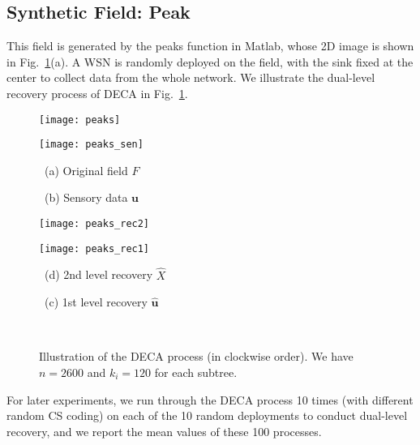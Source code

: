\documentclass[conference]{IEEEtran}
\begin{document}
  \subsection{Synthetic Field: Peak} \label{sec:peak}
This field is generated by the \textsf{peaks} function in Matlab, whose 2D image is shown in Fig.~\ref{fig:peaksdata}(a). A WSN is randomly deployed on the field, with the sink fixed at the center to collect data from the whole network. We illustrate the dual-level recovery process of DECA in Fig.~\ref{fig:peaksdata}.
    \begin{figure}[ht]
      \begin{center}
\parbox{.48\columnwidth}{\center \texttt{[image: peaks]}}
        \parbox{.48\columnwidth}{\center \texttt{[image: peaks\_sen]}}
        \parbox{.48\columnwidth}{\center\scriptsize~(a) Original field $F$}
        \parbox{.48\columnwidth}{\center\scriptsize~(b) Sensory data $\mathbf{u}$}
        \parbox{.48\columnwidth}{\center \texttt{[image: peaks\_rec2]}} \parbox{.48\columnwidth}{\center \texttt{[image: peaks\_rec1]}} \parbox{.48\columnwidth}{\center\scriptsize~(d) 2nd level recovery $\hat{X}$}\parbox{.48\columnwidth}{\center\scriptsize~(c) 1st level recovery $\mathbf{\hat{u}}$}\\\caption{Illustration of the DECA process (in clockwise order). We have $n = 2600$ and $k_i = 120$ for each subtree.}
        \label{fig:peaksdata}
      \end{center}
\end{figure}
For later experiments, we run through the DECA process 10 times (with different random CS coding) on each of the 10 random deployments to conduct dual-level recovery, and we report the mean values of these 100 processes.
\end{document}
